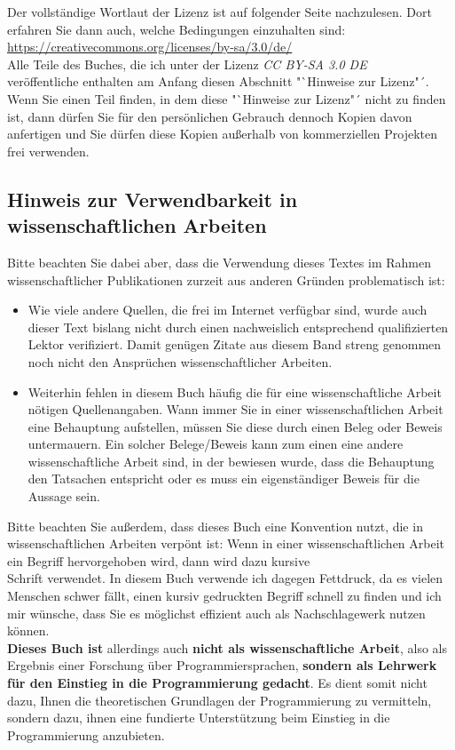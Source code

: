 Der vollständige Wortlaut der Lizenz ist auf folgender Seite nachzulesen. Dort erfahren Sie dann auch, welche Bedingungen einzuhalten sind:\\

\url{https://creativecommons.org/licenses/by-sa/3.0/de/}\\

Alle Teile des Buches, die ich unter der Lizenz \emph{CC BY-SA 3.0 DE}\\
veröffentliche enthalten am Anfang diesen Abschnitt "`Hinweise zur Lizenz"´. Wenn Sie einen Teil finden, in dem diese "`Hinweise zur Lizenz"´ nicht zu finden ist, dann dürfen Sie für den persönlichen Gebrauch dennoch Kopien davon anfertigen und Sie dürfen diese Kopien außerhalb von kommerziellen Projekten frei verwenden.\\

\subsection*{Hinweis zur Verwendbarkeit in wissenschaftlichen Arbeiten}

Bitte beachten Sie dabei aber, dass die Verwendung dieses Textes im Rahmen wissenschaftlicher Publikationen zurzeit aus anderen Gründen problematisch ist:

\begin{itemize}
	\item Wie viele andere Quellen, die frei im Internet verfügbar sind, wurde auch dieser Text bislang nicht durch einen nachweislich entsprechend qualifizierten Lektor verifiziert. Damit genügen Zitate aus diesem Band streng genommen noch nicht den Ansprüchen wissenschaftlicher Arbeiten.
	\item Weiterhin fehlen in diesem Buch häufig die für eine wissenschaftliche Arbeit nötigen Quellenangaben. Wann immer Sie in einer wissenschaftlichen Arbeit eine Behauptung aufstellen, müssen Sie diese durch einen Beleg oder Beweis untermauern. Ein solcher Belege/Beweis kann zum einen eine andere wissenschaftliche Arbeit sind, in der bewiesen wurde, dass die Behauptung den Tatsachen entspricht oder es muss ein eigenständiger Beweis für die Aussage sein.
\end{itemize}

Bitte beachten Sie außerdem, dass dieses Buch eine Konvention nutzt, die in wissenschaftlichen Arbeiten verpönt ist: Wenn in einer wissenschaftlichen Arbeit ein Begriff hervorgehoben wird, dann wird dazu kursive\\
Schrift verwendet. In diesem Buch verwende ich dagegen Fettdruck, da es vielen Menschen schwer fällt, einen kursiv gedruckten Begriff schnell zu finden und ich mir wünsche, dass Sie es möglichst effizient auch als Nachschlagewerk nutzen können.\\

\textbf{Dieses Buch ist} allerdings auch \textbf{nicht als wissenschaftliche Arbeit}, also als Ergebnis einer Forschung über Programmiersprachen, \textbf{sondern als Lehrwerk für den Einstieg in die Programmierung gedacht}. Es dient somit nicht dazu, Ihnen die theoretischen Grundlagen der Programmierung zu vermitteln, sondern dazu, ihnen eine fundierte Unterstützung beim Einstieg in die Programmierung anzubieten.